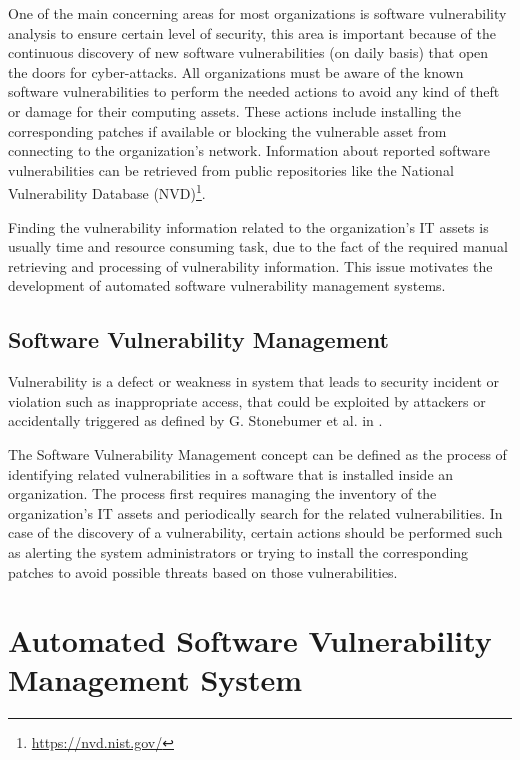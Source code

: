 \documentclass{llncs}
\begin{document}
\par One of the main concerning areas for most organizations is software vulnerability analysis to ensure certain level of security, this area is important because of the continuous discovery of new software vulnerabilities (on daily basis) that open the doors for cyber-attacks. All organizations must be aware of the known software vulnerabilities to perform the needed actions to avoid any kind of theft or damage for their computing assets. These actions include installing the corresponding patches if available or blocking the vulnerable asset from connecting to the organization's network. Information about reported software vulnerabilities can be retrieved from public repositories like the National Vulnerability Database (NVD)\footnote{\url{https://nvd.nist.gov/}}. 
\par Finding the vulnerability information related to the organization's IT assets is usually time and resource consuming task, due to the fact of the required manual retrieving and processing of vulnerability information. This issue motivates the development of automated software vulnerability management systems. 
 
       
\subsection{Software Vulnerability Management}

\par Vulnerability is a defect or weakness in system that leads to security incident or violation such as inappropriate access, that could be exploited by attackers or accidentally triggered as defined by G. Stonebumer et al. in \cite{vuln}.  

\par The Software Vulnerability Management concept can be defined as the process of identifying related vulnerabilities in a software that is installed inside an organization. The process first requires managing the inventory of the organization's IT assets and  periodically search for the related vulnerabilities. In case of the discovery of a vulnerability, certain actions should be performed such as alerting the system administrators or trying to install the corresponding patches to avoid possible threats based on those vulnerabilities. 


\newpage
   
\section{Automated Software Vulnerability Management System}
\end{document}
